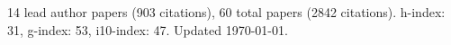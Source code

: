 14 lead author papers (903 citations),
60 total papers (2842 citations).\newline
h-index: 31, g-index: 53, i10-index: 47. Updated \today.